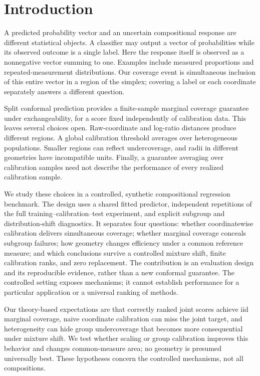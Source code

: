 \section{Introduction}
A predicted probability vector and an uncertain compositional response are different statistical objects. A classifier may output a vector of probabilities while its observed outcome is a single label. Here the response itself is observed as a nonnegative vector summing to one. Examples include measured proportions and repeated-measurement distributions. Our coverage event is simultaneous inclusion of this entire vector in a region of the simplex; covering a label or each coordinate separately answers a different question.

Split conformal prediction provides a finite-sample marginal coverage guarantee under exchangeability, for a score fixed independently of calibration data. This leaves several choices open. Raw-coordinate and log-ratio distances produce different regions. A global calibration threshold averages over heterogeneous populations. Smaller regions can reflect undercoverage, and radii in different geometries have incompatible units. Finally, a guarantee averaging over calibration samples need not describe the performance of every realized calibration sample.

We study these choices in a controlled, synthetic compositional regression benchmark. The design uses a shared fitted predictor, independent repetitions of the full training--calibration--test experiment, and explicit subgroup and distribution-shift diagnostics. It separates four questions: whether coordinatewise calibration delivers simultaneous coverage; whether marginal coverage conceals subgroup failures; how geometry changes efficiency under a common reference measure; and which conclusions survive a controlled mixture shift, finite calibration ranks, and zero replacement. The contribution is an evaluation design and its reproducible evidence, rather than a new conformal guarantee. The controlled setting exposes mechanisms; it cannot establish performance for a particular application or a universal ranking of methods.

Our theory-based expectations are that correctly ranked joint scores achieve iid marginal coverage, naive coordinate calibration can miss the joint target, and heterogeneity can hide group undercoverage that becomes more consequential under mixture shift. We test whether scaling or group calibration improves this behavior and changes common-measure area; no geometry is presumed universally best. These hypotheses concern the controlled mechanisms, not all compositions.
